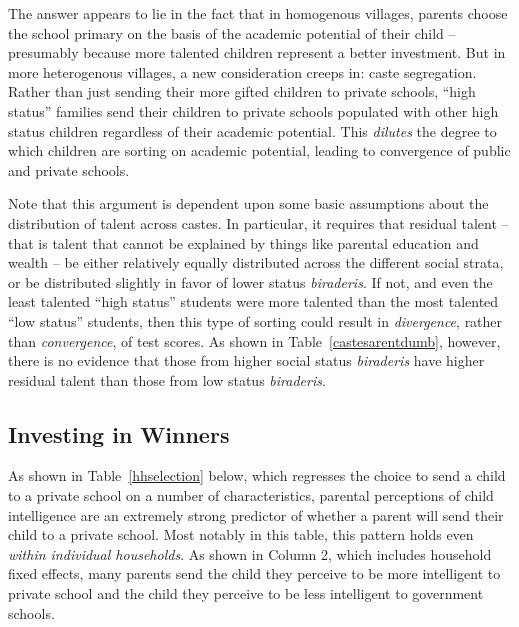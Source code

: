 \documentclass[12pt]{article}
\begin{document}


The answer appears to lie in the fact that in homogenous villages, parents choose the school primary on the basis of the academic potential of their child -- presumably because more talented children represent a better investment. But in more heterogenous villages, a new consideration creeps in: caste segregation. Rather than just sending their more gifted children to private schools, ``high status'' families send their children to private schools populated with other high status children regardless of their academic potential. This \emph{dilutes} the degree to which children are sorting on academic potential, leading to convergence of public and private schools.

Note that this argument is dependent upon some basic assumptions about the distribution of talent across castes. In particular, it requires that residual talent -- that is talent that cannot be explained by things like parental education and wealth -- be either relatively equally distributed across the different social strata, or be distributed slightly in favor of lower status \emph{biraderis}. If not, and even the least talented ``high status'' students were more talented than the most talented ``low status'' students, then this type of sorting could result in \emph{divergence}, rather than \emph{convergence}, of test scores. As shown in Table~\ref{castesarentdumb}, however, there is no evidence that those from higher social status \emph{biraderis} have higher residual talent than those from low status \emph{biraderis}.




\subsection{Investing in Winners}\label{}

As shown in Table~\ref{hhselection} below, which regresses the choice to send a child to a private school on a number of characteristics, parental perceptions of child intelligence are an extremely strong predictor of whether a parent will send their child to a private school. Most notably in this table, this pattern holds even \emph{within individual households}. As shown in Column 2, which includes household fixed effects, many parents send the child they perceive to be more intelligent to private school and the child they perceive to be less intelligent to government schools. 
\end{document}
